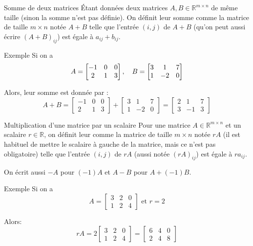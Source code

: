 \documentclass[a4paper]{article}
\begin{document}
\begin{parag}{Somme de deux matrices}
    Étant données deux matrices $A, B \in \mathbb{R}^{m \times n}$ de même taille (sinon la somme n'est pas définie). On définit leur somme comme la matrice de taille $m \times n$ notée $A + B$ telle que l'entrée $\left(i, j\right)$ de $A + B$ (qu'on peut aussi écrire $\left(A + B\right)_{ij}$) est égale à $a_{ij} + b_{ij}$.

    \begin{subparag}{Exemple}
        Si on a
        \[A = \begin{bmatrix} -1 & 0 & 0 \\ 2 & 1 & 3 \end{bmatrix}, \quad B = \begin{bmatrix} 3 & 1 & 7 \\ 1 & -2 & 0 \end{bmatrix} \]

        Alors, leur somme est donnée par :
        \[A + B = \begin{bmatrix} -1 & 0 & 0 \\ 2 & 1 & 3 \end{bmatrix} + \begin{bmatrix} 3 & 1 & 7 \\ 1 & -2 & 0 \end{bmatrix} = \begin{bmatrix} 2 & 1 & 7 \\ 3 & -1 & 3 \end{bmatrix} \]
    \end{subparag}
\end{parag}

\begin{parag}{Multiplication d'une matrice par un scalaire}
    Pour une matrice $A \in \mathbb{R}^{m \times n}$ et un scalaire $r \in \mathbb{R}$, on définit leur  comme la matrice de taille $m \times n$ notée $rA$ (il est habituel de mettre le scalaire à gauche de la matrice, mais ce n'est pas obligatoire) telle que l'entrée $\left(i, j\right)$ de $rA$ (aussi notée $\left(rA\right)_{ij}$) est égale à $ra_{ij}$.

    On écrit aussi $-A$ pour $\left(-1\right)A$ et $A - B$ pour $A + \left(-1\right)B$.

    \begin{subparag}{Exemple}
        Si on a
        \[A = \begin{bmatrix} 3 & 2 & 0 \\ 1 & 2 & 4 \end{bmatrix} \text{ et } r = 2\]

        Alors:
        \[rA = 2\begin{bmatrix} 3 & 2 & 0 \\ 1 & 2 & 4 \end{bmatrix} = \begin{bmatrix} 6 & 4 & 0 \\ 2 & 4 & 8 \end{bmatrix} \]
    \end{subparag}
\end{parag}
\end{document}
